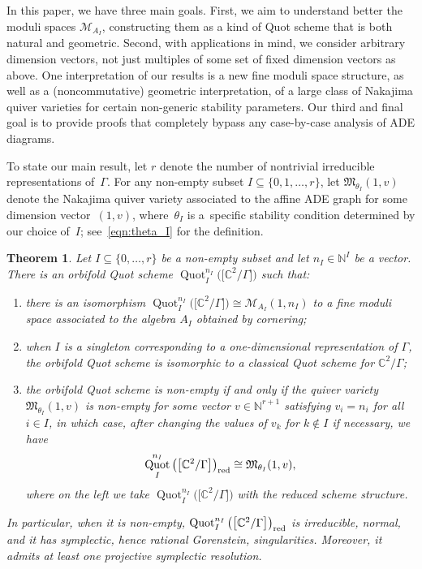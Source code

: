 \documentclass[pdftex]{sigma}%
\newtheorem{Theorem}{Theorem}[section]
\newcommand{\SC}{\mathbb{C}} %
\newcommand{\C}{\SC} %
\newcommand{\PiQ}{A}
\DeclareMathOperator{\Quot}{\mathrm{Quot}}
\newcommand{\QuotI}[1][ ]{\Quot_I^{#1}}
\newcommand{\QuotInI}{\QuotI[n_I]}
\numberwithin{equation}{section}
\begin{document}
In this paper, we have three main goals.
First, we aim to
understand better the moduli spaces $\mathcal{M}_{\PiQ_I}$,
constructing them as a kind of Quot scheme
that is both natural and geometric.
Second, with applications in mind, we consider arbitrary dimension vectors, not just multiples of some set of fixed dimension vectors as above. One interpretation of our results is a new fine moduli space structure, as well as a (noncommutative)
geometric interpretation, of a large class of
Nakajima quiver varieties for certain non-generic stability parameters.
Our third and final goal is to provide proofs that completely bypass any case-by-case analysis of ADE diagrams.

To state our main result,
let $r$ denote the number of nontrivial irreducible representations of~$\Gamma$.
For any non-empty subset $I\subseteq \{0,1,\dots,r\}$, let $\mathfrak{M}_{\theta_I}(1,v)$ denote the Nakajima quiver variety associated to the affine ADE graph for some dimension vector~$(1,v)$, where~$\theta_I$ is a~specific stability condition determined by our choice of~$I$; see~\eqref{eqn:theta_I} for the definition.

\begin{Theorem}\label{thm:mainintro}\label{mainthm}
Let $I\subseteq \{0,\ldots, r\}$ be a non-empty subset and
let $n_I\in {\mathbb N}^I$ be a vector. There is an orbifold Quot scheme $\QuotInI \big(\big[\SC^2/\Gamma\big]\big)$ such that:
\begin{enumerate}\itemsep=0pt
\item[$1)$] there is an isomorphism $\QuotInI \big(\big[\SC^2/\Gamma\big]\big) \cong \mathcal{M}_{\PiQ_I} (1,n_I)$ to a fine moduli space associated to the algebra $A_I$ obtained by cornering;
\item[$2)$] when $I$ is a singleton corresponding to a one-dimensional representation of $\Gamma$, the orbifold Quot scheme is isomorphic to a
classical Quot scheme for $\C^2/\Gamma$;
\item[$3)$]
the orbifold Quot scheme is non-empty if and only if the quiver variety $\mathfrak{M}_{\theta_I}(1,v)$ is non-empty for some vector
$v\in \mathbb{N}^{r+1}$ satisfying $v_i=n_i$ for all $i\in I$, in which case, after changing the values of $v_k$ for $k\not\in I$ if necessary, we have 
\[
\QuotInI \big(\big[\SC^2/\Gamma\big]\big)_{\rm red} \cong \mathfrak{M}_{\theta_I}(1,v),
\]
 where on the left we take $\QuotInI \big(\big[\SC^2/\Gamma\big]\big)$ with the reduced scheme structure.
\end{enumerate}
In particular, when it is non-empty, $\QuotInI \big(\big[\SC^2/\Gamma\big]\big)_{\rm red}$ is irreducible, normal, and it has symplectic, hence rational Gorenstein, singularities. Moreover, it admits at least one projective symplectic resolution.
\end{Theorem}
\end{document}
